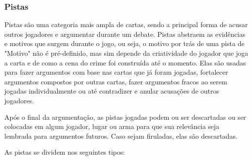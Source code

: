 \documentclass[a4paper, 11pt]{article}
\begin{document}
	\subsubsection*{Pistas}

		Pistas são uma categoria mais ampla de cartas, sendo a principal forma de acusar outros jogadores e argumentar durante um debate. Pistas abstraem as evidências e motivos que surgem durante o jogo, ou seja, o motivo por trás de uma pista de "Motivo" não é pré-definido, mas sim depende da criatividade do jogador que joga a carta e de como a cena do crime foi construída até o momento. Elas são usadas para fazer argumentos com base nas cartas que já foram jogadas, fortalecer argumentos compostos por outras cartas, fazer argumentos fracos ao serem jogadas individualmente ou até contradizer e anular acusações de outros jogadores. 
		
		Após o final da argumentação, as pistas jogadas podem ou ser descartadas ou ser colocadas em algum jogador, lugar ou arma para que sua relevância seja lembrada para argumentos futuros. Caso sejam firuladas, elas são descartadas.
		
		As pistas se dividem nos seguintes tipos:
\end{document}
